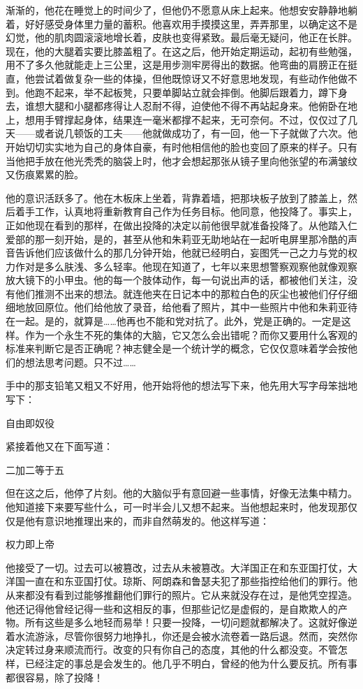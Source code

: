 渐渐的，他花在睡觉上的时间少了，但他仍不愿意从床上起来。他想安安静静地躺着，好好感受身体里力量的蓄积。他喜欢用手摸摸这里，弄弄那里，以确定这不是幻觉，他的肌肉圆滚滚地增长着，皮肤也变得紧致。最后毫无疑问，他正在长胖。现在，他的大腿着实要比膝盖粗了。在这之后，他开始定期运动，起初有些勉强，用不了多久他就能走上三公里，这是用步测牢房得出的数据。他弯曲的肩膀正在挺直，他尝试着做复杂一些的体操，但他既惊讶又不好意思地发现，有些动作他做不到。他跑不起来，举不起板凳，只要单脚站立就会摔倒。他脚后跟着力，蹲下身去，谁想大腿和小腿都疼得让人忍耐不得，迫使他不得不再站起身来。他俯卧在地上，想用手臂撑起身体，结果连一毫米都撑不起来，无可奈何。不过，仅仅过了几天——或者说几顿饭的工夫——他就做成功了，有一回，他一下子就做了六次。他开始切切实实地为自己的身体自豪，有时他相信他的脸也变回了原来的样子。只有当他把手放在他光秃秃的脑袋上时，他才会想起那张从镜子里向他张望的布满皱纹又伤痕累累的脸。

他的意识活跃多了。他在木板床上坐着，背靠着墙，把那块板子放到了膝盖上，然后着手工作，认真地将重新教育自己作为任务目标。他同意，他投降了。事实上，正如他现在看到的那样，在做出投降的决定以前他很早就准备投降了。从他踏入仁爱部的那一刻开始，是的，甚至从他和朱莉亚无助地站在一起听电屏里那冷酷的声音告诉他们应该做什么的那几分钟开始，他就已经明白，妄图凭一己之力与党的权力作对是多么肤浅、多么轻率。他现在知道了，七年以来思想警察观察他就像观察放大镜下的小甲虫。他的每一个肢体动作，每一句说出声的话，都被他们关注，没有他们推测不出来的想法。就连他夹在日记本中的那粒白色的灰尘也被他们仔仔细细地放回原位。他们给他放了录音，给他看了照片，其中一些照片中他和朱莉亚待在一起。是的，就算是\ldots\ldots 他再也不能和党对抗了。此外，党是正确的。一定是这样。作为一个永生不死的集体的大脑，它又怎么会出错呢？而你又要用什么客观的标准来判断它是否正确呢？神志健全是一个统计学的概念，它仅仅意味着学会按他们的想法思考问题。只不过\ldots\ldots{}

手中的那支铅笔又粗又不好用，他开始将他的想法写下来，他先用大写字母笨拙地写下：

自由即奴役

紧接着他又在下面写道：

二加二等于五

但在这之后，他停了片刻。他的大脑似乎有意回避一些事情，好像无法集中精力。他知道接下来要写些什么，可一时半会儿又想不起来。当他想起来时，他发现那仅仅是他有意识地推理出来的，而非自然萌发的。他这样写道：

权力即上帝

他接受了一切。过去可以被篡改，过去从未被篡改。大洋国正在和东亚国打仗，大洋国一直在和东亚国打仗。琼斯、阿朗森和鲁瑟夫犯了那些指控给他们的罪行。他从来都没有看到过能够推翻他们罪行的照片。它从来就没存在过，是他凭空捏造。他还记得他曾经记得一些和这相反的事，但那些记忆是虚假的，是自欺欺人的产物。所有这些是多么地轻而易举！只要一投降，一切问题就都解决了。这就好像逆着水流游泳，尽管你很努力地挣扎，你还是会被水流卷着一路后退。然而，突然你决定转过身来顺流而行。改变的只有你自己的态度，其他的什么都没变。不管怎样，已经注定的事总是会发生的。他几乎不明白，曾经的他为什么要反抗。所有事都很容易，除了投降！

